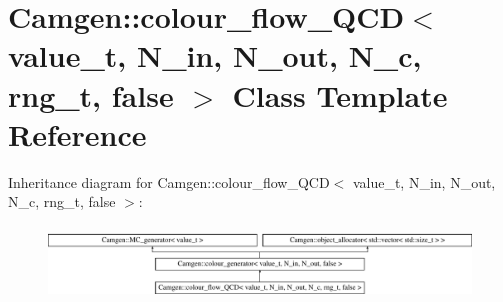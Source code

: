\hypertarget{a00075}{}\section{Camgen\+:\+:colour\+\_\+flow\+\_\+\+Q\+C\+D$<$ value\+\_\+t, N\+\_\+in, N\+\_\+out, N\+\_\+c, rng\+\_\+t, false $>$ Class Template Reference}
\label{a00075}
Inheritance diagram for Camgen\+:\+:colour\+\_\+flow\+\_\+\+Q\+C\+D$<$ value\+\_\+t, N\+\_\+in, N\+\_\+out, N\+\_\+c, rng\+\_\+t, false $>$\+:\begin{figure}[H]
\begin{center}
\leavevmode
\includegraphics[height=1.995250cm]{a00075}
\end{center}
\end{figure}
